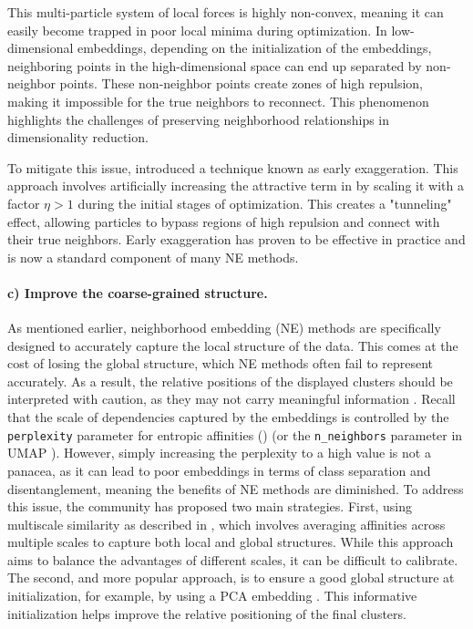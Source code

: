 This multi-particle system of local forces is highly non-convex, meaning it can easily become trapped in poor local minima during optimization. In low-dimensional embeddings, depending on the initialization of the embeddings, neighboring points in the high-dimensional space can end up separated by non-neighbor points. These non-neighbor points create zones of high repulsion, making it impossible for the true neighbors to reconnect. This phenomenon highlights the challenges of preserving neighborhood relationships in dimensionality reduction. 

To mitigate this issue, \citet{van2008visualizing} introduced a technique known as early exaggeration. This approach involves artificially increasing the attractive term in  by scaling it with a factor $\eta > 1$ during the initial stages of optimization. This creates a "tunneling" effect, allowing particles to bypass regions of high repulsion and connect with their true neighbors. Early exaggeration has proven to be effective in practice and is now a standard component of many NE methods.


\paragraph{c) Improve the coarse-grained structure.} As mentioned earlier, neighborhood embedding (NE) methods are specifically designed to accurately capture the local structure of the data. This comes at the cost of losing the global structure, which NE methods often fail to represent accurately. As a result, the relative positions of the displayed clusters should be interpreted with caution, as they may not carry meaningful information \citep{kobak2019art}. Recall that the scale of dependencies captured by the embeddings is controlled by the \texttt{perplexity} parameter for entropic affinities () (or the \texttt{n\_neighbors} parameter in UMAP \citep{mcinnes2018umap}). However, simply increasing the perplexity to a high value is not a panacea, as it can lead to poor embeddings in terms of class separation and disentanglement, meaning the benefits of NE methods are diminished. To address this issue, the community has proposed two main strategies. First, using multiscale similarity as described in \citep{lee2015multi}, which involves averaging affinities across multiple scales to capture both local and global structures. While this approach aims to balance the advantages of different scales, it can be difficult to calibrate. The second, and more popular approach, is to ensure a good global structure at initialization, for example, by using a PCA embedding \citep{wattenberg2016use}. This informative initialization helps improve the relative positioning of the final clusters.

